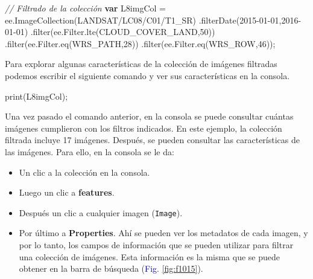 \documentclass[
  12pt,
  letterpaper,
  twoside]{book}
\newenvironment{Shaded}{\begin{snugshade}}{\end{snugshade}}
\newcommand{\AttributeTok}[1]{\textcolor[rgb]{0.48,0.12,0.64}{#1}}
\newcommand{\CommentTok}[1]{\textcolor[rgb]{0.24,0.58,0.00}{\textit{#1}}}
\newcommand{\ControlFlowTok}[1]{\textcolor[rgb]{0.00,0.00,0.00}{\textbf{#1}}}
\newcommand{\DecValTok}[1]{\textcolor[rgb]{0.28,0.53,0.93}{#1}}
\newcommand{\FunctionTok}[1]{\textcolor[rgb]{0.48,0.12,0.64}{#1}}
\newcommand{\KeywordTok}[1]{\textcolor[rgb]{0.48,0.12,0.64}{#1}}
\newcommand{\NormalTok}[1]{#1}
\newcommand{\OperatorTok}[1]{\textcolor[rgb]{0.00,0.00,0.00}{#1}}
\newcommand{\StringTok}[1]{\textcolor[rgb]{0.87,0.29,0.22}{#1}}
\providecommand{\tightlist}{%
  \setlength{\itemsep}{0pt}\setlength{\parskip}{0pt}}
\begin{document}
\begin{Shaded}
\begin{Highlighting}[]
\CommentTok{// Filtrado de la colección}
\ControlFlowTok{var}\NormalTok{ L8imgCol }\OperatorTok{=} \KeywordTok{ee}\OperatorTok{.}\FunctionTok{ImageCollection}\NormalTok{(}\StringTok{\textquotesingle{}LANDSAT/LC08/C01/T1\_SR\textquotesingle{}}\NormalTok{)}
  \OperatorTok{.}\FunctionTok{filterDate}\NormalTok{(}\StringTok{\textquotesingle{}2015{-}01{-}01\textquotesingle{}}\OperatorTok{,}\StringTok{\textquotesingle{}2016{-}01{-}01\textquotesingle{}}\NormalTok{)}
  \OperatorTok{.}\FunctionTok{filter}\NormalTok{(}\KeywordTok{ee}\OperatorTok{.}\AttributeTok{Filter}\OperatorTok{.}\FunctionTok{lte}\NormalTok{(}\StringTok{\textquotesingle{}CLOUD\_COVER\_LAND\textquotesingle{}}\OperatorTok{,}\DecValTok{50}\NormalTok{))}
  \OperatorTok{.}\FunctionTok{filter}\NormalTok{(}\KeywordTok{ee}\OperatorTok{.}\AttributeTok{Filter}\OperatorTok{.}\FunctionTok{eq}\NormalTok{(}\StringTok{\textquotesingle{}WRS\_PATH\textquotesingle{}}\OperatorTok{,}\DecValTok{28}\NormalTok{))}
  \OperatorTok{.}\FunctionTok{filter}\NormalTok{(}\KeywordTok{ee}\OperatorTok{.}\AttributeTok{Filter}\OperatorTok{.}\FunctionTok{eq}\NormalTok{(}\StringTok{\textquotesingle{}WRS\_ROW\textquotesingle{}}\OperatorTok{,}\DecValTok{46}\NormalTok{))}\OperatorTok{;}
\end{Highlighting}
\end{Shaded}

Para explorar algunas características de la colección de imágenes filtradas podemos escribir el siguiente comando y ver sus características en la consola.

\begin{Shaded}
\begin{Highlighting}[]
\FunctionTok{print}\NormalTok{(L8imgCol)}\OperatorTok{;}
\end{Highlighting}
\end{Shaded}

Una vez pasado el comando anterior, en la consola se puede consultar cuántas imágenes cumplieron con los filtros indicados. En este ejemplo, la colección filtrada incluye 17 imágenes. Después, se pueden consultar las características de las imágenes. Para ello, en la consola se le da:

\begin{itemize}
\tightlist
\item
  Un clic a la colección en la consola.
\item
  Luego un clic a \textbf{features}.
\item
  Después un clic a cualquier imagen (\texttt{Image}).
\item
  Por último a \textbf{Properties}. Ahí se pueden ver los metadatos de cada imagen, y por lo tanto, los campos de información que se pueden utilizar para filtrar una colección de imágenes. Esta información es la misma que se puede obtener en la barra de búsqueda (\textcolor{darkblue}{Fig.} \ref{fig:f1015}).
\end{itemize}
\end{document}
